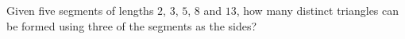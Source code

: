 Given five segments of lengths $2$, $3$, $5$, $8$ and $13$, how many distinct triangles can be formed using three of the segments as the sides?
